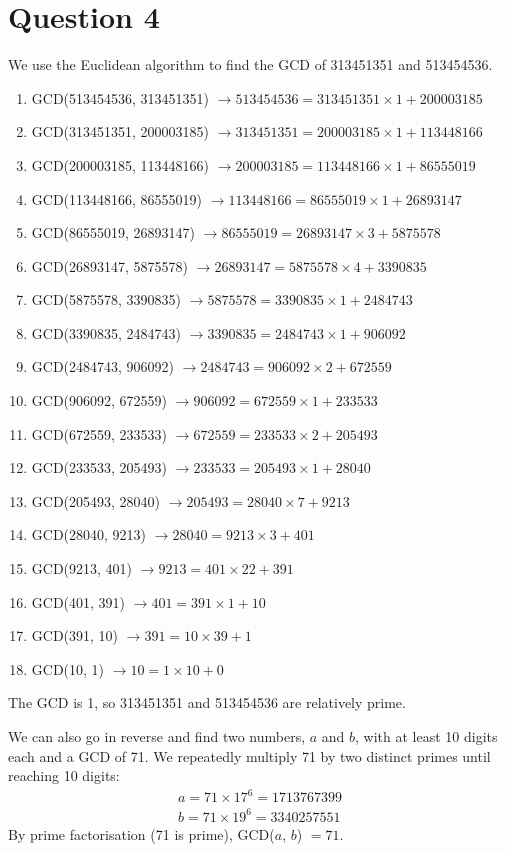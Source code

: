\section*{Question 4}

We use the Euclidean algorithm to find the GCD of 313451351 and 513454536.

\begin{enumerate}
    \item GCD(513454536, 313451351) $\longrightarrow 513454536 = 313451351 \times 1 + 200003185$
    \item GCD(313451351, 200003185) $\longrightarrow 313451351 = 200003185 \times 1 + 113448166$
    \item GCD(200003185, 113448166) $\longrightarrow 200003185 = 113448166 \times 1 + 86555019$
    \item GCD(113448166, 86555019) $\longrightarrow 113448166 = 86555019 \times 1 + 26893147$
    \item GCD(86555019, 26893147) $\longrightarrow 86555019 = 26893147 \times 3 + 5875578$
    \item GCD(26893147, 5875578) $\longrightarrow 26893147 = 5875578 \times 4 + 3390835$
    \item GCD(5875578, 3390835) $\longrightarrow 5875578 = 3390835 \times 1 + 2484743$
    \item GCD(3390835, 2484743) $\longrightarrow 3390835 = 2484743 \times 1 + 906092$
    \item GCD(2484743, 906092) $\longrightarrow 2484743 = 906092 \times 2 + 672559$
    \item GCD(906092, 672559) $\longrightarrow 906092 = 672559 \times 1 + 233533$
    \item GCD(672559, 233533) $\longrightarrow 672559 = 233533 \times 2 + 205493$
    \item GCD(233533, 205493) $\longrightarrow 233533 = 205493 \times 1 + 28040$
    \item GCD(205493, 28040) $\longrightarrow 205493 = 28040 \times 7 + 9213$
    \item GCD(28040, 9213) $\longrightarrow 28040 = 9213 \times 3 + 401$
    \item GCD(9213, 401) $\longrightarrow 9213 = 401 \times 22 + 391$
    \item GCD(401, 391) $\longrightarrow 401 = 391 \times 1 + 10$
    \item GCD(391, 10) $\longrightarrow 391 = 10 \times 39 + 1$
    \item GCD(10, 1) $\longrightarrow 10 = 1 \times 10 + 0$
\end{enumerate}

The GCD is 1, so 313451351 and 513454536 are relatively prime.

We can also go in reverse and find two numbers, $a$ and $b$, with at least 10 digits each and a GCD of 71. We repeatedly multiply 71 by two distinct primes until reaching 10 digits:
\begin{align*}
    a = 71 \times 17^{6} = 1713767399 \\
    b = 71 \times 19^{6} = 3340257551
\end{align*}
By prime factorisation (71 is prime), GCD($a$, $b$) $= 71$.
